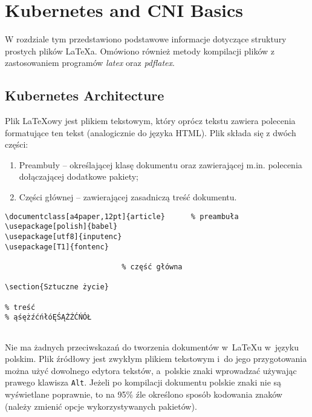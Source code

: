 \chapter{Kubernetes and CNI Basics}
\label{cha:k8s_cni}

W rozdziale tym przedstawiono podstawowe informacje dotyczące struktury prostych plików \LaTeX a. Omówiono również metody kompilacji plików z zastosowaniem programów \emph{latex} oraz \emph{pdflatex}.


\section{Kubernetes Architecture}
\label{sec:k8s_arch}

Plik \LaTeX owy jest plikiem tekstowym, który oprócz tekstu zawiera polecenia formatujące ten tekst (analogicznie do języka HTML). Plik składa się z dwóch części:
\begin{enumerate}%
\item Preambuły -- określającej klasę dokumentu oraz zawierającej m.in. polecenia dołączającej dodatkowe pakiety;

\item Części głównej -- zawierającej zasadniczą treść dokumentu.
\end{enumerate}


\begin{lstlisting}
\documentclass[a4paper,12pt]{article}      % preambuła
\usepackage[polish]{babel}
\usepackage[utf8]{inputenc}
\usepackage[T1]{fontenc}

                           % część główna

\section{Sztuczne życie}

% treść
% ąśężźćńłóĘŚĄŻŹĆŃÓŁ


\end{lstlisting}

Nie ma żadnych przeciwskazań do tworzenia dokumentów w~\LaTeX u w~języku polskim. Plik źródłowy jest zwykłym plikiem tekstowym i~do jego przygotowania można użyć dowolnego edytora tekstów, a~polskie znaki wprowadzać używając prawego klawisza \texttt{Alt}. Jeżeli po kompilacji dokumentu polskie znaki nie są wyświetlane poprawnie, to na 95\% źle określono sposób kodowania znaków (należy zmienić opcje wykorzystywanych pakietów).



